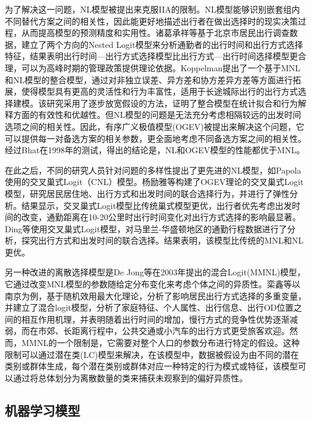 为了解决这一问题，NL模型\cite{train1978goods}被提出来克服IIA的限制。NL模型能够识别嵌套组内不同替代方案之间的相关性，因此能更好地描述出行者在做出选择时的现实决策过程，从而提高模型的预测精度和实用性。诸葛承祥等\cite{诸葛承祥}基于北京市居民出行调查数据，建立了两个方向的Nested Logit模型来分析通勤者的出行时间和出行方式选择特征，结果表明出行时间—出行方式选择模型比出行方式—出行时间选择模型更合理，可以为高峰时期的管理政策提供理论依据。Koppelman\cite{KOPPELMAN2005825}提出了一个基于MNL和NL模型的整合模型，通过对非独立误差、异方差和协方差异方差等方面进行拓展，使得模型具有更高的灵活性和行为丰富性，适用于长途城际出行的出行方式选择建模。该研究采用了逐步放宽假设的方法，证明了整合模型在统计拟合和行为解释方面的有效性和优越性。但NL模型的问题是无法充分考虑相隔较远的出发时间选项之间的相关性\cite{bhat1998analysis}。因此，有序广义极值模型(OGEV)被提出来解决这个问题，它可以提供每一对备选方案的相关参数，更全面地考虑不同备选方案之间的相关性。经过Bhat在1998年的测试\cite{bhat1998comparison}，得出的结论是，NL和OGEV模型的性能都优于MNL。

在此之后，不同的研究人员针对问题的多样性提出了更先进的NL模型，如Papola\cite{papola2004some}使用的交叉巢式Logit（CNL）模型。杨励雅等\cite{杨励雅}构建了OGEV理论的交叉巢式Logit模型，研究居民居住地、出行方式和出发时间的联合选择行为，并进行了弹性分析。结果显示，交叉巢式Logit模型比传统巢式模型更优，出行者优先考虑出发时间的改变，通勤距离在10-20公里时出行时间变化对出行方式选择的影响最显著。Ding等\cite{ding2015cross}使用交叉巢式Logit模型，对马里兰-华盛顿地区的通勤行程数据进行了分析，探究出行方式和出发时间的联合选择。结果表明，该模型比传统的MNL和NL更优。

另一种改进的离散选择模型是De Jong等\cite{de2003model}在2003年提出的混合Logit(MMNL)模型，它通过改变MNL模型的参数随给定分布变化来考虑个体之间的异质性。栾鑫等\cite{栾鑫}以南京为例，基于随机效用最大化理论，分析了影响居民出行方式选择的多重变量，并建立了混合logit模型，分析了家庭特征、个人属性、出行信息、出行OD位置之间的相互作用机理，并表明随着出行时间的增加，慢行方式的竞争性优势逐渐减弱，而在市郊、长距离行程中，公共交通或小汽车的出行方式更受旅客欢迎。然而，MMNL的一个限制是，它需要对整个人口的参数分布进行特定的假设\cite{hensher2003mixed}。这种限制可以通过潜在类(LC)模型来解决，在该模型中，数据被假设为由不同的潜在类别或群体生成，每个潜在类别或群体对应一种特定的行为模式或特征，该模型可以通过将总体划分为离散数量的类来捕获未观察到的偏好异质性\cite{fukuda2010semiparametric}。

\subsection{机器学习模型}

